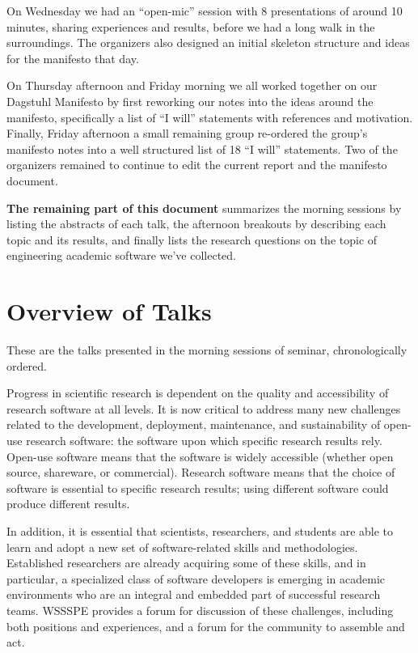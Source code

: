 \documentclass[a4paper,UKenglish]{dagrep}
\begin{document}
On Wednesday we had an ``open-mic'' session with 8 presentations of around 10 minutes, sharing experiences and results, before we had a long walk in the surroundings. The organizers also designed an initial skeleton structure and ideas for the manifesto that day.

On Thursday afternoon and Friday morning we all worked together on our Dagstuhl Manifesto by first reworking our notes into the ideas around the manifesto, specifically a list of ``I will'' statements with references and motivation. Finally, Friday afternoon a small remaining group re-ordered the group's manifesto notes into a well structured list of 18 ``I will'' statements. Two of the organizers remained to continue to edit the current report and the manifesto document.

\textbf{The remaining part of this document} summarizes the morning sessions by listing the abstracts of each talk, the afternoon breakouts by describing each topic and its results, and finally lists the research questions on the topic of engineering academic software we've collected.

\tableofcontents

\section{Overview of Talks}

These are the talks presented in the morning sessions of seminar, chronologically ordered.



Progress in scientific research is dependent on the quality and accessibility of research software at all levels. It is now critical to address many new challenges related to the development, deployment, maintenance, and sustainability of open-use research software: the software upon which specific research results rely.  Open-use software means that the software is widely accessible (whether open source, shareware, or commercial).  Research software means that the choice of software is essential to specific research results; using different software could produce different results.

In addition, it is essential that scientists, researchers, and students are able to learn and adopt a new set of software-related skills and methodologies. Established researchers are already acquiring some of these skills, and in particular, a specialized class of software developers is emerging in academic environments who are an integral and embedded part of successful research teams. WSSSPE provides a forum for discussion of these challenges, including both positions and experiences, and a forum for the community to assemble and act.
\end{document}
